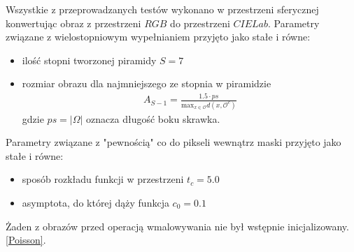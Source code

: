 \documentclass[12pt, twoside, openany]{report}
\theoremstyle{definition}
\begin{document}
Wszystkie z przeprowadzanych testów wykonano w przestrzeni sferycznej konwertując obraz z przestrzeni $RGB$ do przestrzeni $CIELab$. Parametry związane z wielostopniowym wypełnianiem przyjęto jako stałe i równe:
\begin{itemize}
\item
ilość stopni tworzonej piramidy $S=7$
\item
rozmiar obrazu dla najmniejszego ze stopnia w piramidzie 
\begin{align}
A_{S-1}=\frac{1.5 \cdot ps}{\mathrm{max}_{x \in \mathcal{O}}d(x,\mathcal{O}^{c})}
\end{align}
gdzie $ps = |\Omega|$ oznacza długość boku skrawka.
\end{itemize}
Parametry związane z "pewnością" co do pikseli wewnątrz maski przyjęto jako stałe i równe:
\begin{itemize}
\item
sposób rozkładu funkcji w przestrzeni $t_{c}=5.0$
\item
asymptota, do której dąży funkcja $c_{0}=0.1$
\end{itemize}
Żaden z obrazów przed operacją wmalowywania nie był wstępnie inicjalizowany. \eqref{Poisson}.
\end{document}
